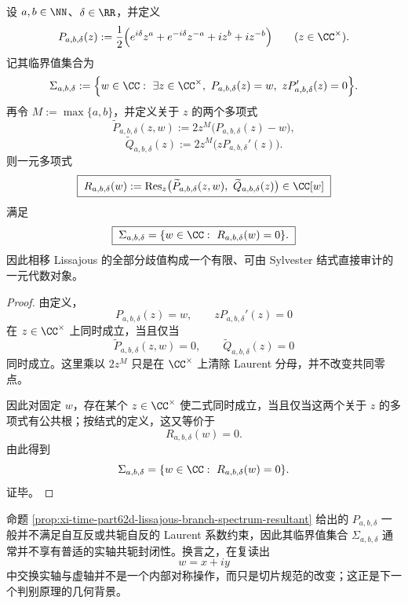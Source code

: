 \begin{proposition}\label{prop:xi-time-part62d-lissajous-branch-spectrum-resultant}
设 \(a,b\in\NN\)、\(\delta\in\RR\)，并定义
\[
P_{a,b,\delta}(z):=
\frac12\Bigl(
e^{i\delta}z^a+e^{-i\delta}z^{-a}
+iz^b+iz^{-b}
\Bigr)
\qquad(z\in\CC^\times).
\]
记其临界值集合为
\[
\Sigma_{a,b,\delta}:=
\Bigl\{
w\in\CC:\ \exists z\in\CC^\times,\
P_{a,b,\delta}(z)=w,\
zP_{a,b,\delta}'(z)=0
\Bigr\}.
\]
再令 \(M:=\max\{a,b\}\)，并定义关于 \(z\) 的两个多项式
\[
\widetilde P_{a,b,\delta}(z,w):=
2z^M\bigl(P_{a,b,\delta}(z)-w\bigr),
\]
\[
\widetilde Q_{a,b,\delta}(z):=
2z^M\bigl(zP_{a,b,\delta}'(z)\bigr).
\]
则一元多项式
\[
\boxed{\;
R_{a,b,\delta}(w):=
\operatorname{Res}_{z}
\bigl(
\widetilde P_{a,b,\delta}(z,w),\
\widetilde Q_{a,b,\delta}(z)
\bigr)
\in\CC[w]\;}
\]
满足
\[
\boxed{\;
\Sigma_{a,b,\delta}
=
\{w\in\CC:\ R_{a,b,\delta}(w)=0\}.\;}
\]
因此相移 Lissajous 的全部分歧值构成一个有限、可由 Sylvester 结式直接审计的一元代数对象。
\end{proposition}
\begin{proof}
由定义，
\[
P_{a,b,\delta}(z)=w,\qquad zP_{a,b,\delta}'(z)=0
\]
在 \(z\in\CC^\times\) 上同时成立，当且仅当
\[
\widetilde P_{a,b,\delta}(z,w)=0,
\qquad
\widetilde Q_{a,b,\delta}(z)=0
\]
同时成立。这里乘以 \(2z^M\) 只是在 \(\CC^\times\) 上清除 Laurent 分母，并不改变共同零点。

因此对固定 \(w\)，存在某个 \(z\in\CC^\times\) 使二式同时成立，当且仅当这两个关于 \(z\) 的多项式有公共根；按结式的定义，这又等价于
\[
R_{a,b,\delta}(w)=0.
\]
由此得到
\[
\Sigma_{a,b,\delta}
=
\{w\in\CC:\ R_{a,b,\delta}(w)=0\}.
\]
证毕。
\end{proof}

\begin{remark}[复嵌入下的轴交换不是结构对称]\label{rem:xi-time-part62d-axis-exchange-not-structural-symmetry}
命题 \ref{prop:xi-time-part62d-lissajous-branch-spectrum-resultant} 给出的 \(P_{a,b,\delta}\) 一般并不满足自互反或共轭自反的 Laurent 系数约束，因此其临界值集合 \(\Sigma_{a,b,\delta}\) 通常并不享有普适的实轴共轭封闭性。换言之，在复读出
\[
w=x+iy
\]
中交换实轴与虚轴并不是一个内部对称操作，而只是切片规范的改变；这正是下一个判别原理的几何背景。
\end{remark}

